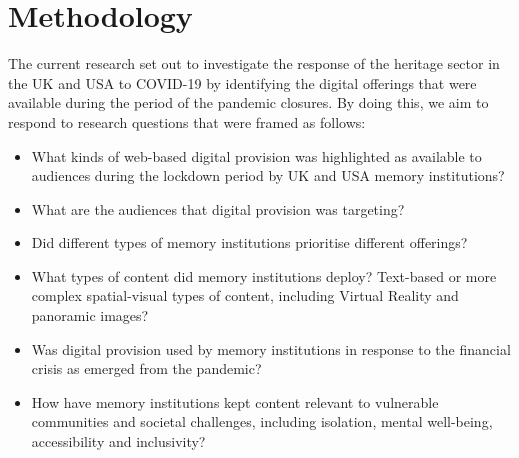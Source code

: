 \documentclass{egpubl}
\begin{document}
\section{Methodology}
\label{meth}


The current research set out to investigate the response of the heritage sector in the UK and USA to COVID-19 by identifying the digital offerings that were available during the period of the pandemic closures. By doing this, we aim to respond to research questions that were framed as follows:

\begin{itemize}
\item What kinds of web-based digital provision was highlighted as available to audiences during the lockdown period by UK and USA memory institutions? 
\item What are the audiences that digital provision was targeting?
\item Did different types of memory institutions prioritise different offerings?
\item What types of content did memory institutions deploy? Text-based or more complex spatial-visual types of content, including Virtual Reality and panoramic images?
\item Was digital provision used by memory institutions in response to the financial crisis as emerged from the pandemic?
\item How have memory institutions kept content relevant to vulnerable communities and societal challenges, including isolation, mental well-being, accessibility and inclusivity?
\end{itemize}
\end{document}
